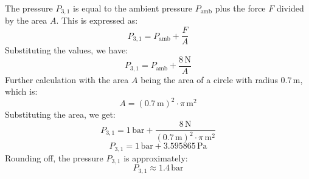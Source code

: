 The pressure \( P_{3,1} \) is equal to the ambient pressure \( P_{\text{amb}} \) plus the force \( F \) divided by the area \( A \). This is expressed as:
\[ P_{3,1} = P_{\text{amb}} + \frac{F}{A} \]
Substituting the values, we have:
\[ P_{3,1} = P_{\text{amb}} + \frac{8 \, \text{N}}{A} \]
Further calculation with the area \( A \) being the area of a circle with radius \( 0.7 \, \text{m} \), which is:
\[ A = (0.7 \, \text{m})^2 \cdot \pi \, \text{m}^2 \]
Substituting the area, we get:
\[ P_{3,1} = 1 \, \text{bar} + \frac{8 \, \text{N}}{(0.7 \, \text{m})^2 \cdot \pi \, \text{m}^2} \]
\[ P_{3,1} = 1 \, \text{bar} + 3.595865 \, \text{Pa} \]
Rounding off, the pressure \( P_{3,1} \) is approximately:
\[ P_{3,1} \approx 1.4 \, \text{bar} \]
